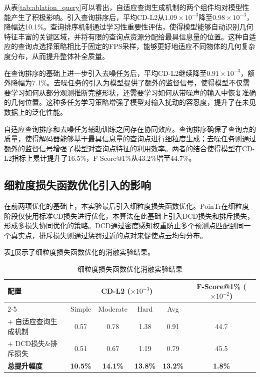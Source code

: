 从表\ref{tab:ablation_query}可以看出，自适应查询生成机制的两个组件均对模型性能产生了积极影响。引入查询排序后，平均CD-L2从$1.09 \times 10^{-3}$降至$0.98 \times 10^{-3}$，降幅达10.1\%。查询排序机制通过学习性重要性评估，使得模型能够自动识别几何特征丰富的关键区域，并将有限的查询点资源分配给最具信息量的位置。这种自适应的查询点选择策略相比于固定的FPS采样，能够更好地适应不同物体的几何复杂度分布，从而提升整体补全质量。

在查询排序的基础上进一步引入去噪任务后，平均CD-L2继续降至$0.91 \times 10^{-3}$，额外降幅为7.1\%。去噪任务的引入为模型提供了额外的监督信号，使得模型不仅需要学习如何从部分观测推断完整形状，还需要学习如何从带噪声的输入中恢复准确的几何位置。这种多任务学习策略增强了模型对输入扰动的容忍度，提升了在未见数据上的泛化性能。

自适应查询排序和去噪任务辅助训练之间存在协同效应。查询排序确保了查询点的质量，使得解码器能够基于最具信息量的查询点进行细粒度生成；去噪任务则通过额外的监督信号增强了模型对查询点特征的利用效率。两者的结合使得模型在CD-L2指标上累计提升了16.5\%，F-Score@1\%从43.2\%增至44.7\%。

\subsection{细粒度损失函数优化引入的影响}

在前两项优化的基础上，本实验最后引入细粒度损失函数优化。PoinTr在细粒度阶段仅使用标准CD损失进行优化，本算法在此基础上引入DCD损失和排斥损失，形成多损失协同优化的策略。DCD通过密度感知权重防止多个预测点匹配到同一个真实点，排斥损失则通过惩罚过近的点对来促使点云均匀分布。

表\ref{tab:ablation_fine}展示了细粒度损失函数优化的消融实验结果。
\FloatBarrier
\begin{table}[htbp]
\centering
\caption{细粒度损失函数优化消融实验结果}
\label{tab:ablation_fine}
\begin{tabular}{lccccc}
\toprule
\multirow{2}{*}{配置} & \multicolumn{4}{c}{CD-L2 ($\times 10^{-3}$)} & \multirow{2}{*}{F-Score@1\% ($\times 10^{-2}$)} \\
\cmidrule(lr){2-5}
& Simple & Moderate & Hard & Avg & \\
\midrule
+ 自适应查询生成机制 & 0.57 & 0.78 & 1.38 & 0.91 & 44.7 \\
+ DCD损失\&排斥损失 & 0.51 & 0.67 & 1.19 & 0.79 & 45.5 \\
\midrule
\textbf{总提升幅度} & \textbf{10.5\%} & \textbf{14.1\%} & \textbf{13.8\%} & \textbf{13.2\%} & \textbf{1.8\%} \\
\bottomrule
\end{tabular}
\end{table}
\FloatBarrier

